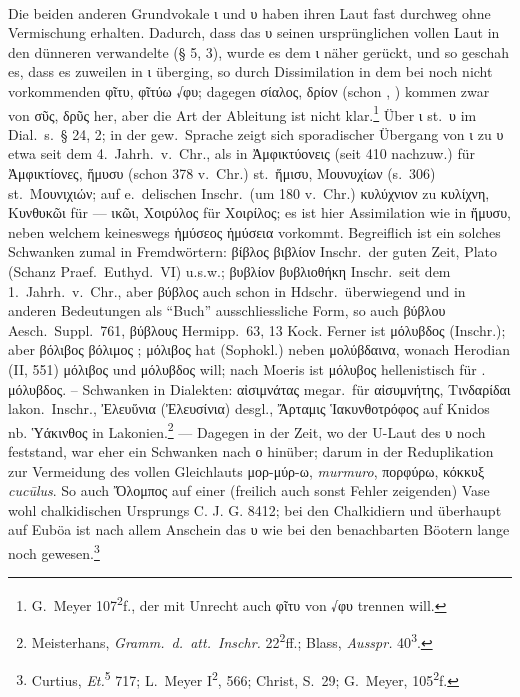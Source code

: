\paragraph{}Die beiden anderen Grundvokale ι und υ haben ihren Laut fast
durchweg ohne Vermischung erhalten. Dadurch, dass das υ seinen ursprünglichen
vollen Laut  in den dünneren  verwandelte (§ 5, 3), wurde es dem ι näher
gerückt, und so geschah es, dass es zuweilen in ι überging, so durch
Dissimilation in dem bei  noch nicht vorkommenden φῖτυ, φῖτύω √φυ;
dagegen σίαλος, δρίον (schon , ) kommen zwar von σῦς, δρῦς her, aber die
Art der Ableitung ist nicht klar.\footnote{
  G.~Meyer 107\textsuperscript{2}f., der mit Unrecht auch φῖτυ von √φυ trennen
  will.
} 
Über ι st.\ υ im  Dial.\ s.\ § 24, 2; in
der gew.\ Sprache zeigt sich sporadischer Übergang von ι zu υ etwa seit dem 4.\
Jahrh.~v.~Chr., als in Ἀμφικτύονεις (seit 410 {nachzuw.}) für Ἀμφικτίονες, ἥμυσυ
(schon 378 v.\ {Chr.}) st.\ ἥμισυ, Μουνυχίων (s.\ 306) st.\ Μουνιχιών; auf e.\
delischen Inschr.\ (um 180 {v.\ Chr.}) κυλύχνιον zu κυλίχνη, Κυνθυκῶι für — ικῶι,
Χοιρύλος für Χοιρίλος; es ist hier Assimilation wie in ἥμυσυ, neben welchem
keineswegs ἡμύσεος ἡμύσεια vorkommt. Begreiflich ist ein solches Schwanken zumal
in Fremdwörtern: βίβλος βιβλίον \glsxtrshort{att} Inschr.\ der guten Zeit, Plato (Schanz
Praef.\ Euthyd.\ VI) u.s.w.; βυβλίον βυβλιοθήκη Inschr.\ seit dem 1.\
Jahrh.~v.~Chr., aber βύβλος auch schon in  Hdschr.\
überwiegend und in
anderen Bedeutungen als “Buch” ausschliessliche Form, so auch βύβλου Aesch.\
Suppl.\ 761,
βύβλους Hermipp.\ 63, 13 Kock.
Ferner ist μόλυβδος \langlong{att} (Inschr.); aber
βόλιβος βόλιμος ; μόλιβος hat  (Sophokl.) neben μολύβδαινα, wonach
Herodian (II, 551) μόλιβος und μόλυβδος will; nach Moeris ist μόλυβος
hellenistisch
für \glsxtrshort{att}. μόλυβδος.
-- Schwanken in Dialekten: αἰσιμνάτας megar.\ für αἰσυμνήτης,
Τινδαρίδαι lakon.\ Inschr., Ἐλευὕνια (Ἐλευσίνια) desgl., Ἄρταμις Ἱακυνθοτρόφος
auf Knidos nb. Ὑάκινθος in Lakonien.\footnote{Meisterhans, \emph{Gramm.\ d.\
  att.\ Inschr.} 22\textsuperscript{2}ff.; Blass, \emph{Ausspr.}
40\textsuperscript{3}.} — Dagegen in der Zeit, wo der U-Laut des
υ noch feststand, war eher ein Schwanken nach ο hinüber; darum in der
Reduplikation zur Vermeidung des vollen Gleichlauts μορ-μύρ-ω, \emph{murmuro}, πορφύρω,
κόκκυξ \emph{cucūlus}. So auch Ὄλομπος auf einer (freilich auch sonst Fehler zeigenden)
Vase wohl chalkidischen Ursprungs C. J. G. 8412; bei den Chalkidiern und
überhaupt auf Euböa ist nach allem Anschein das υ wie bei den benachbarten
Böotern lange noch \ipa{u} gewesen.\footnote{
  Curtius, \emph{Et.}\textsuperscript{5} 717; L.~Meyer I\textsuperscript{2},
  566; Christ, S.\ 29; G.~Meyer, 105\textsuperscript{2}f.
}

